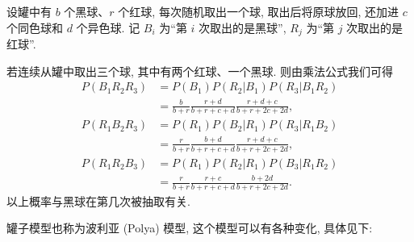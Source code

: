 \begin{example}[罐子模型]\label{exam1.4.4}
    设罐中有 $b$ 个黑球、$r$ 个红球,
    每次随机取出一个球,
    取出后将原球放回,
    还加进 $c$ 个同色球和 $d$ 个异色球.
    记 $B_i$ 为“第 $i$ 次取出的是黑球”,
    $R_j$ 为“第 $j$ 次取出的是红球”.

    若连续从罐中取出三个球,
    其中有两个红球、一个黑球.
    则由乘法公式我们可得
    \begin{align*}
        P(B_1 R_2 R_3)
         & = P(B_1) P(R_2 | B_1) P(R_3 | B_1 R_2)                       \\
         & = \frac{b}{b+r} \frac{r+d}{b+r+c+d} \frac{r+d+c}{b+r+2c+2d}, \\
        P(R_1 B_2 R_3)
         & = P(R_1) P(B_2 | R_1) P(R_3 | R_1 B_2)                       \\
         & = \frac{r}{b+r} \frac{b+d}{b+r+c+d} \frac{r+d+c}{b+r+2c+2d}, \\
        P(R_1 R_2 B_3)
         & = P(R_1) P(R_2 | R_1) P(B_3 | R_1 R_2)                       \\
         & = \frac{r}{b+r} \frac{r+c}{b+r+c+d} \frac{b+2d}{b+r+2c+2d}.
    \end{align*}
    以上概率与黑球在第几次被抽取有关.
\end{example}

罐子模型也称为波利亚 (Polya) 模型,
这个模型可以有各种变化,
具体见下:

